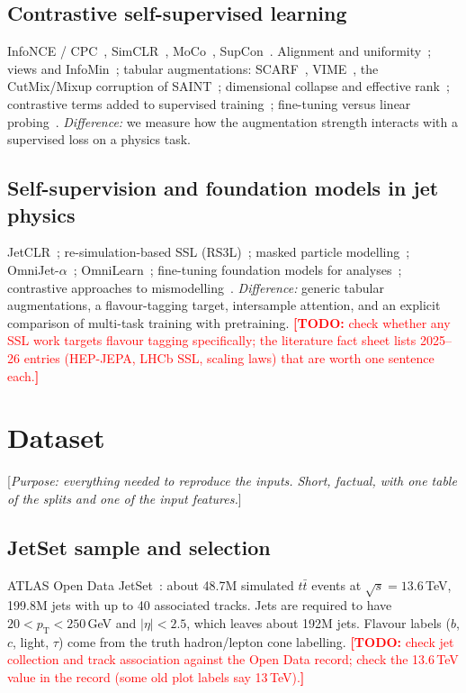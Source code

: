 \documentclass[11pt,a4paper]{article}
\newcommand{\todo}[1]{\textcolor{red}{\textbf{[TODO:} #1\textbf{]}}}
\newcommand{\note}[1]{\textcolor{blue!70!black}{[\emph{#1}]}}
\newcommand{\ttbar}{\ensuremath{t\bar{t}}}
\newcommand{\pT}{\ensuremath{p_{\mathrm{T}}}}
\begin{document}
\subsection{Contrastive self-supervised learning}
InfoNCE / CPC~\citep{oord2018representation}, SimCLR~\citep{Chen2020SimCLR},
MoCo~\citep{He2020MoCo}, SupCon~\citep{Khosla2020SupCon}. Alignment and
uniformity~\citep{Wang2020AlignmentUniformity}; views and InfoMin~\citep{tian2020makes};
tabular augmentations: SCARF~\citep{Bahri2022SCARF}, VIME~\citep{Yoon2020VIME}, the
CutMix/Mixup corruption of SAINT~\citep{Yun2019CutMix,Zhang2018mixup};
dimensional collapse and effective rank~\citep{Jing2022DimCollapse,Roy2007EffectiveRank,Garrido2023RankMe};
contrastive terms added to supervised training~\citep{Gunel2021SCLFinetune}; fine-tuning
versus linear probing~\citep{Kumar2022FTDistorts}. \emph{Difference:} we measure how
the augmentation strength interacts with a supervised loss on a physics task.

\subsection{Self-supervision and foundation models in jet physics}
JetCLR~\citep{Dillon2022JetCLR}; re-simulation-based SSL (RS3L)~\citep{Harris2025Resim};
masked particle modelling~\citep{golling2024masked}; OmniJet-$\alpha$~\citep{Birk2024OmniJet};
OmniLearn~\citep{Mikuni2025OmniLearn}; fine-tuning foundation models for
analyses~\citep{vigl2024finetuning}; contrastive approaches to mismodelling~\citep{Sheldon2025MACK}.
\emph{Difference:} generic tabular augmentations, a flavour-tagging target, intersample
attention, and an explicit comparison of multi-task training with pretraining.
\todo{check whether any SSL work targets flavour tagging specifically; the literature
fact sheet lists 2025--26 entries (HEP-JEPA, LHCb SSL, scaling laws) that are worth one
sentence each.}

\section{Dataset}
\label{sec:data}

\note{Purpose: everything needed to reproduce the inputs. Short, factual, with one
table of the splits and one of the input features.}

\subsection{JetSet sample and selection}
ATLAS Open Data JetSet~\citep{ATLASJetSet2025}: about 48.7M simulated \ttbar{} events at
$\sqrt{s}=13.6$\,TeV, 199.8M jets with up to 40 associated tracks. Jets are required to
have $20<\pT<250$\,GeV and $|\eta|<2.5$, which leaves about 192M jets. Flavour labels
($b$, $c$, light, $\tau$) come from the truth hadron/lepton cone labelling.
\todo{check jet collection and track association against the Open Data record; check the
13.6\,TeV value in the record (some old plot labels say 13\,TeV).}
\end{document}
